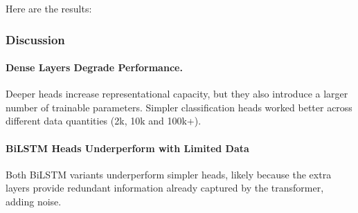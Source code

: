 \documentclass[11pt]{article}
\begin{document}
Here are the results:
\begin{table}[htbp]
\centering
\label{tab:ablation_results}
\vspace{0.5em}
\begin{minipage}{\textwidth}

\end{minipage}
\end{table}

\subsubsection{Discussion}
% 

\paragraph{Dense Layers Degrade Performance.}
Deeper heads increase representational capacity, but they also introduce a larger number of trainable parameters. Simpler classification heads worked better across different data quantities (2k, 10k and 100k+).

\paragraph{BiLSTM Heads Underperform with Limited Data}
Both BiLSTM variants underperform simpler heads, likely because the extra layers provide redundant information already captured by the transformer, adding noise.
\end{document}
